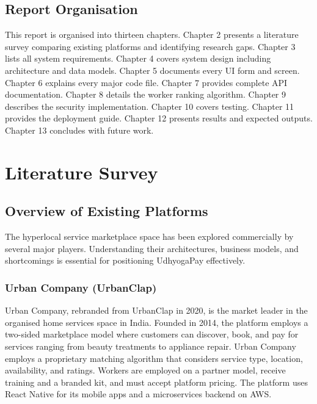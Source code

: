 \documentclass[12pt,a4paper]{report}
\begin{document}
\section{Report Organisation}

This report is organised into thirteen chapters. Chapter 2 presents a literature survey comparing existing platforms and identifying research gaps. Chapter 3 lists all system requirements. Chapter 4 covers system design including architecture and data models. Chapter 5 documents every UI form and screen. Chapter 6 explains every major code file. Chapter 7 provides complete API documentation. Chapter 8 details the worker ranking algorithm. Chapter 9 describes the security implementation. Chapter 10 covers testing. Chapter 11 provides the deployment guide. Chapter 12 presents results and expected outputs. Chapter 13 concludes with future work.

\chapter{Literature Survey}

\section{Overview of Existing Platforms}

The hyperlocal service marketplace space has been explored commercially by several major players. Understanding their architectures, business models, and shortcomings is essential for positioning UdhyogaPay effectively.

\subsection{Urban Company (UrbanClap)}

Urban Company, rebranded from UrbanClap in 2020, is the market leader in the organised home services space in India. Founded in 2014, the platform employs a two-sided marketplace model where customers can discover, book, and pay for services ranging from beauty treatments to appliance repair. Urban Company employs a proprietary matching algorithm that considers service type, location, availability, and ratings. Workers are employed on a partner model, receive training and a branded kit, and must accept platform pricing. The platform uses React Native for its mobile apps and a microservices backend on AWS.
\end{document}
